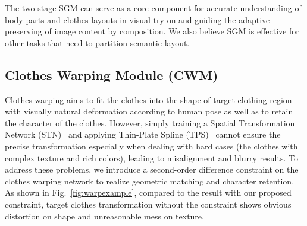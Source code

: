 \documentclass[10pt,twocolumn,letterpaper]{article}
\begin{document}
The two-stage SGM can serve as a core component for accurate understanding of body-parts and clothes layouts in visual try-on and guiding
the adaptive preserving of image content by composition. We also believe SGM is effective for other tasks that need to partition semantic layout.


\subsection{Clothes Warping Module (CWM)}

Clothes warping aims to fit the clothes into the shape of target clothing region with visually natural deformation according to human pose as well as to retain the character of the clothes.
However, simply training a Spatial Transformation Network (STN)~\cite{jaderberg2015spatial} and applying Thin-Plate Spline (TPS)~\cite{duchon1977splines}  cannot ensure the precise transformation especially when dealing with hard cases (\ie the clothes with complex texture and rich colors), leading to misalignment and blurry results. To address these problems, we introduce a second-order difference constraint on the clothes warping network to realize geometric matching and character retention. As shown in Fig.~\ref{fig:warpexample}, compared to the result with our proposed constraint, target clothes transformation without the constraint shows obvious distortion on shape and unreasonable mess on texture.

 
\end{document}
